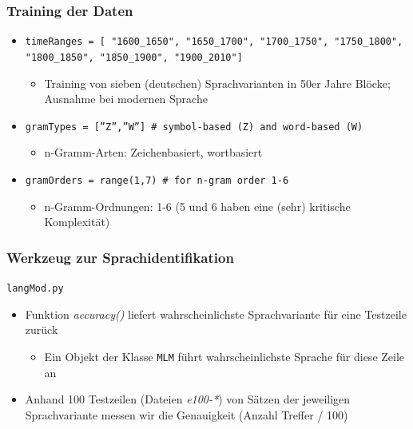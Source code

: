 \documentclass[t]{beamer} %
\begin{document}
\begin{frame}
  \frametitle{Training der Daten}
  \begin{itemize}
  \item \texttt{timeRanges = [ "1600\_1650", "1650\_1700", "1700\_1750", "1750\_1800", "1800\_1850", "1850\_1900", "1900\_2010"]}
  	\begin{itemize}
  	\item Training von sieben (deutschen) Sprachvarianten in 50er Jahre Blöcke; Ausnahme bei modernen Sprache
  	\end{itemize}\pause
  \item \texttt{gramTypes = [''Z'',''W''] \# symbol-based (Z) and word-based (W)}
  	\begin{itemize}
   	\item n-Gramm-Arten: Zeichenbasiert, wortbasiert
  	\end{itemize}\pause
  \item \texttt{gramOrders = range(1,7) \# for n-gram order 1-6}
  	\begin{itemize}
   	\item n-Gramm-Ordnungen: 1-6 (5 und 6 haben eine (sehr) kritische Komplexität)
  	\end{itemize}
  \end{itemize}  
\end{frame}


% 
\begin{frame}
  \frametitle{Werkzeug zur Sprachidentifikation}
  \texttt{langMod.py}
  \begin{itemize}
  \item Funktion \emph{accuracy()} liefert wahrscheinlichste Sprachvariante für eine Testzeile zurück
   \begin{itemize}
    \item Ein Objekt der Klasse \texttt{MLM} führt wahrscheinlichste Sprache für diese Zeile an
   \end{itemize}\pause
  \item Anhand 100 Testzeilen (Dateien \emph{e100-*}) von Sätzen der jeweiligen Sprachvariante messen wir die Genauigkeit (Anzahl Treffer / 100)
  \end{itemize}  
\end{frame}
\end{document}
